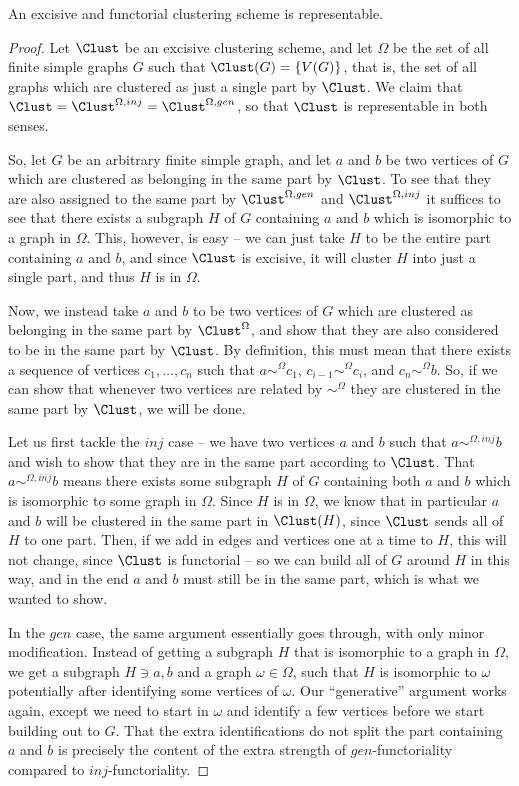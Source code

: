 \documentclass[a4paper,reqno,oneside]{article} %
\begin{document}
\begin{lemma}\label{excisive_and_functorial_is_representable}
An excisive and functorial clustering scheme is representable.
\begin{proof}
Let $\Clust$ be an excisive clustering scheme, and let $\Omega$ be the set of all finite simple graphs $G$ such that $\Clust(G) = \{V(G)\}$, that is, the set of all graphs which are clustered as just a single part by $\Clust$. We claim that $\Clust = \Clust^{\Omega, inj} = \Clust^{\Omega, gen}$, so that $\Clust$ is representable in both senses.

So, let $G$ be an arbitrary finite simple graph, and let $a$ and $b$ be two vertices of $G$ which are clustered as belonging in the same part by $\Clust$. To see that they are also assigned to the same part by $\Clust^{\Omega, gen}$ and $\Clust^{\Omega,inj}$ it suffices to see that there exists a subgraph $H$ of $G$ containing $a$ and $b$ which is isomorphic to a graph in $\Omega$. This, however, is easy -- we can just take $H$ to be the entire part containing $a$ and $b$, and since $\Clust$ is excisive, it will cluster $H$ into just a single part, and thus $H$ is in $\Omega$.

Now, we instead take $a$ and $b$ to be two vertices of $G$ which are clustered as belonging in the same part by $\Clust^\Omega$, and show that they are also considered to be in the same part by $\Clust$. By definition, this must mean that there exists a sequence of vertices $c_1, \ldots, c_n$ such that $a \sim^\Omega c_1$, $c_{i-1} \sim^\Omega c_i$, and $c_n \sim^\Omega b$. So, if we can show that whenever two vertices are related by $\sim^\Omega$ they are clustered in the same part by $\Clust$, we will be done.

Let us first tackle the $inj$ case -- we have two vertices $a$ and $b$ such that $a \sim^{\Omega, inj} b$ and wish to show that they are in the same part according to $\Clust$. That $a \sim^{\Omega, inj} b$ means there exists some subgraph $H$ of $G$ containing both $a$ and $b$ which is isomorphic to some graph in $\Omega$. Since $H$ is in $\Omega$, we know that in particular $a$ and $b$ will be clustered in the same part in $\Clust(H)$, since $\Clust$ sends all of $H$ to one part. Then, if we add in edges and vertices one at a time to $H$, this will not change, since $\Clust$ is functorial -- so we can build all of $G$ around $H$ in this way, and in the end $a$ and $b$ must still be in the same part, which is what we wanted to show.

In the $gen$ case, the same argument essentially goes through, with only minor modification. Instead of getting a subgraph $H$ that is isomorphic to a graph in $\Omega$, we get a subgraph $H \ni a,b$ and a graph $\omega \in \Omega$, such that $H$ is isomorphic to $\omega$ potentially after identifying some vertices of $\omega$. Our ``generative'' argument works again, except we need to start in $\omega$ and identify a few vertices before we start building out to $G$. That the extra identifications do not split the part containing $a$ and $b$ is precisely the content of the extra strength of $gen$-functoriality compared to $inj$-functoriality.
\end{proof}
\end{lemma}
\end{document}
